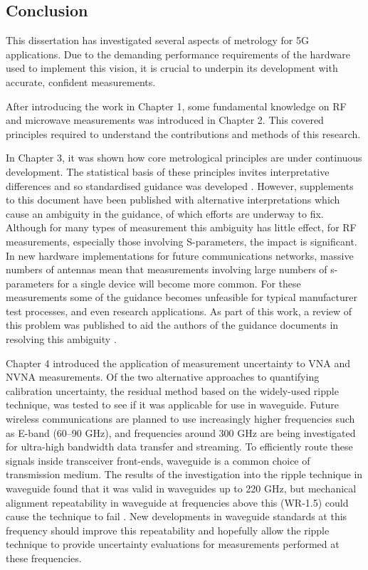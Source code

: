 \documentclass[../thesis/thesis.tex]{subfiles}
\begin{document}
\begin{refsection}
\chapter{Conclusion}

This dissertation has investigated several aspects of metrology for 5G applications. Due to the demanding performance requirements of the hardware used to implement this vision, it is crucial to underpin its development with accurate, confident measurements.

After introducing the work in Chapter 1, some fundamental knowledge on RF and microwave measurements was introduced in Chapter 2. This covered principles required to understand the contributions and methods of this research.

In Chapter 3, it was shown how core metrological principles are under continuous development. The statistical basis of these principles invites interpretative differences and so standardised guidance was developed \cite{GUM_2008}. However, supplements to this document have been published \cite{GUM_S1, GUM_S2} with alternative interpretations which cause an ambiguity in the guidance, of which efforts are underway to fix. Although for many types of measurement this ambiguity has little effect, for RF measurements, especially those involving S-parameters, the impact is significant. In new hardware implementations for future communications networks, massive numbers of antennas mean that measurements involving large numbers of s-parameters for a single device will become more common. For these measurements some of the guidance becomes unfeasible for typical manufacturer test processes, and even research applications. As part of this work, a review of this problem was published to aid the authors of the guidance documents in resolving this ambiguity \cite{Stant_2016}.

Chapter 4 introduced the application of measurement uncertainty to VNA and NVNA measurements. Of the two alternative approaches to quantifying calibration uncertainty, the residual method based on the widely-used ripple technique, was tested to see if it was applicable for use in waveguide. Future wireless communications are planned to use increasingly higher frequencies such as E-band (60--90 GHz), and frequencies around 300 GHz are being investigated for ultra-high bandwidth data transfer and streaming. To efficiently route these signals inside transceiver front-ends, waveguide is a common choice of transmission medium. The results of the investigation into the ripple technique in waveguide found that it was valid in waveguides up to 220 GHz, but mechanical alignment repeatability in waveguide at frequencies above this (WR-1.5) could cause the technique to fail \cite{Stant_2016_Coll,Stant_2017}. New developments in waveguide standards at this frequency should improve this repeatability and hopefully allow the ripple technique to provide uncertainty evaluations for measurements performed at these frequencies.


\end{refsection}
\end{document}
